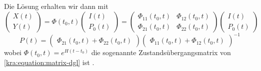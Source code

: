 Die Lösung erhalten wir dann mit
\begin{equation}
    \label{kra:matrixriccati-solution}
    \begin{pmatrix}
        X(t) \\
        Y(t)
    \end{pmatrix}
    =
    \Phi(t_0, t)
    \begin{pmatrix}
        I(t) \\
        P_0(t)
    \end{pmatrix}
    =
    \begin{pmatrix}
        \Phi_{11}(t_0, t) & \Phi_{12}(t_0, t) \\
        \Phi_{21}(t_0, t) & \Phi_{22}(t_0, t)
    \end{pmatrix}
    \begin{pmatrix}
        I(t) \\
        P_0(t)
    \end{pmatrix}
\end{equation}
\begin{equation}
    P(t) =
    \begin{pmatrix}
        \Phi_{21}(t_0, t) + \Phi_{22}(t_0, t)
    \end{pmatrix}
    \begin{pmatrix}
        \Phi_{11}(t_0, t) + \Phi_{12}(t_0, t)
    \end{pmatrix}
    ^{-1}
\end{equation}
wobei $\Phi(t_0, t) = e^{H(t - t_0)}$ die sogenannte Zustandsübergangsmatrix von \eqref{kra:equation:matrix-dgl} ist \cite{kra:kalmanisae}.
